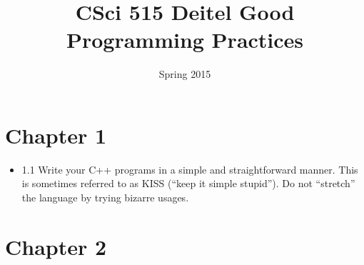 \documentclass[11pt]{article}
\date{Spring 2015}
\title{CSci 515 Deitel Good Programming Practices}
\begin{document}
\maketitle

\section*{Chapter 1}
\label{sec-1}

\begin{itemize}
\item 1.1 Write your C++ programs in a simple and straightforward
manner. This is sometimes referred to as KISS (“keep it simple
stupid”). Do not “stretch” the language by trying bizarre usages.
\end{itemize}
\section*{Chapter 2}
\label{sec-2}
\end{document}
